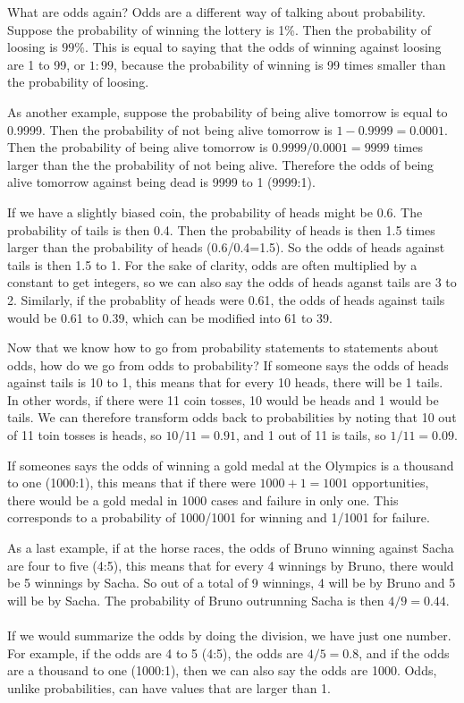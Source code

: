 \documentclass[]{book}\usepackage[]{graphicx}\usepackage[]{color}
\begin{document}
What are odds again? Odds are a different way of talking about probability. Suppose the probability of winning the lottery is 1\%. Then the probability of loosing is $99\%$. This is equal to saying that the odds of winning against loosing are 1 to 99, or $1:99$, because the probability of winning is 99 times smaller than the probability of loosing.

As another example, suppose the probability of being alive tomorrow is equal to 0.9999. Then the probability of not being alive tomorrow is $1-0.9999=0.0001$. Then the probability of being alive tomorrow is $0.9999/0.0001=9999$ times larger than the the probability of not being alive. Therefore the odds of being alive tomorrow against being dead is 9999 to 1 (9999:1).

If we have a slightly biased coin, the probability of heads might be 0.6. The probability of tails is then 0.4. Then the probability of heads is then 1.5 times larger than the probability of heads (0.6/0.4=1.5). So the odds of heads against tails is then 1.5 to 1. For the sake of clarity, odds are often multiplied by a constant to get integers, so we can also say the odds of heads aganst tails are 3 to 2. Similarly, if the probablity of heads were 0.61, the odds of heads against tails would be 0.61 to 0.39, which can be modified into 61 to 39.

Now that we know how to go from probability statements to statements about odds, how do we go from odds to probability? If someone says the odds of heads against tails is 10 to 1, this means that for every 10 heads, there will be 1 tails. In other words, if there were 11 coin tosses, 10 would be heads and 1 would be tails. We can therefore transform odds back to probabilities by noting that 10 out of 11 toin tosses is heads, so $10/11 = 0.91$, and 1 out of 11 is tails, so $1/11=0.09$.

If someones says the odds of winning a gold medal at the Olympics is a thousand to one (1000:1), this means that if there were $1000+1=1001$ opportunities, there would be a gold medal in 1000 cases and failure in only one. This corresponds to a probability of 1000/1001 for winning and 1/1001 for failure.

As a last example, if at the horse races, the odds of Bruno winning against Sacha are four to five (4:5), this means that for every 4 winnings by Bruno, there would be 5 winnings by Sacha. So out of a total of 9 winnings, 4 will be by Bruno and 5 will be by Sacha. The probability of Bruno outrunning Sacha is then $4/9=0.44$.
\\
\\
If we would summarize the odds by doing the division, we have just one number. For example, if the odds are 4 to 5 (4:5), the odds are $4/5=0.8$, and if the odds are a thousand to one (1000:1), then we can also say the odds are 1000. Odds, unlike probabilities, can have values that are larger than 1. 
\end{document}
